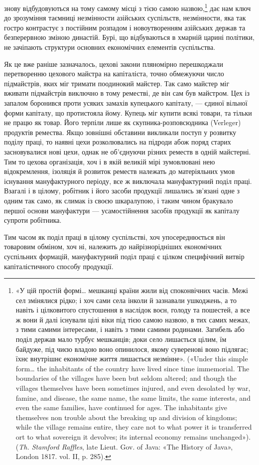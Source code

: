 \parcont{}  %
знову відбудовуються на тому самому місці з тією самою назвою,\footnote{
«У цій простій формі\dots{} мешканці країни жили від споконвічних
часів. Межі сел змінялися рідко; і хоч сами села інколи й зазнавали
ушкоджень, а то навіть і цілковитого спустошення в наслідок воєн,
голоду та пошестей, а все ж вони й далі існували цілі віки під тією самою
назвою, в тих самих межах, з тими самими інтересами, і навіть з тими
самими родинами. Загибель або поділ держав мало турбує мешканців;
доки село лишається цілим, їм байдуже, під чиєю владою воно опинилося,
якому суверенові воно підлягає; їхнє внутрішнє економічне життя
лишається незмінне». («Under this simple form\dots{} the inhabitants of the
country have lived since time immemorial. The boundaries of the villages
have been but seldom altered; and though the villages themselves have
been sometimes injured, and even desolated by war, famine, and disease,
the same name, the same limits, the same interests, and even the same
families, have continued for ages. The inhabitants give themselves non
trouble about the breaking up and division of kingdoms; while the village
remains entire, they care not to what power it is transferred ort to what
sovereign it devolves; its internal economy remains unchanged»). (\emph{Th. Stamford
Raffles}, late Lieut. Gov. of Java: «The History of Java», London 1817.
vol. II, p. 285).
} дає нам ключ до зрозуміння таємниці незмінности азійських
суспільств, незмінности, яка так гостро контрастує з постійним
розпадом і новоутворенням азійських держав та безперервною
зміною династій. Бурі, що відбуваються в хмарній царині політики,
не зачіпають структури основних економічних елементів
суспільства.

Як це вже раніше зазначалось, цехові закони пляномірно
перешкоджали перетворенню цехового майстра на капіталіста,
точно обмежуючи число підмайстрів, яких міг тримати поодинокий
майстер. Так само майстер міг вживати підмайстрів виключно
в тому реместві, де він сам був майстром. Цех із запалом
боронився проти усяких замахів купецького капіталу, —
єдиної вільної форми капіталу, що протистояла йому. Купець
міг купити всякі товари, та тільки не працю як товар. Його терпіли
лише як скупника-розповсюдника (Verleger) продуктів
ремества. Якщо зовнішні обставини викликали поступ у розвитку
поділу праці, то наявні цехи розколювались на підроди абож
поряд старих засновувалися нові цехи, однак не об’єднуючи різних
реместв в одній майстерні. Тим то цехова організація, хоч і в
якій великій мірі зумовлювані нею відокремлення, ізоляція й
розвиток реместв належать до матеріяльних умов існування
мануфактурного періоду, все ж виключала мануфактурний поділ
праці. Взагалі і в цілому, робітник і його засоби продукції
лишались зв’язані одне з одним так само, як слимак із своєю
шкаралупою, і таким чином бракувало першої основи мануфактури
— усамостійнення засобів продукції як капіталу супроти
робітника.

Тим часом як поділ праці в цілому суспільстві, хоч упосереднюється
він товаровим обміном, хоч ні, належить до найрізнорідніших
економічних суспільних формацій, мануфактурний
поділ праці є цілком специфічний витвір капіталістичного способу
продукції.
